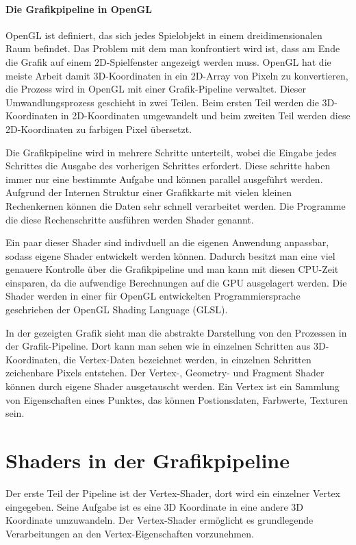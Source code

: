 \subsubsection{Die Grafikpipeline in OpenGL}

OpenGL ist definiert, das sich jedes Spielobjekt in einem dreidimensionalen Raum befindet. Das Problem mit dem man konfrontiert wird ist, dass am Ende die Grafik auf einem 2D-Spielfenster angezeigt werden muss. OpenGL hat die meiste Arbeit damit 3D-Koordinaten in ein 2D-Array von Pixeln zu konvertieren, die Prozess wird in OpenGL mit einer Grafik-Pipeline verwaltet. Dieser Umwandlungsprozess geschieht in zwei Teilen. Beim ersten Teil werden die 3D-Koordinaten in 2D-Koordinaten umgewandelt und beim zweiten Teil werden diese 2D-Koordinaten zu farbigen Pixel übersetzt.

Die Grafikpipeline wird in mehrere Schritte unterteilt, wobei die Eingabe jedes Schrittes die Ausgabe des vorherigen Schrittes erfordert. Diese schritte haben immer nur eine bestimmte Aufgabe und können parallel ausgeführt werden. Aufgrund der Internen Struktur einer Grafikkarte mit vielen kleinen Rechenkernen können die Daten sehr schnell verarbeitet werden. Die Programme die diese Rechenschritte ausführen werden Shader genannt.

Ein paar dieser Shader sind indivduell an die eigenen Anwendung anpassbar, sodass eigene Shader entwickelt werden können. Dadurch besitzt man eine viel genauere Kontrolle über die Grafikpipeline und man kann mit diesen CPU-Zeit einsparen, da die aufwendige Berechnungen auf die GPU ausgelagert werden. Die Shader werden in einer für OpenGL entwickelten Programmiersprache geschrieben der OpenGL Shading Language (GLSL).


In der gezeigten Grafik sieht man die abstrakte Darstellung von den Prozessen in der Grafik-Pipeline. Dort kann man sehen wie in einzelnen Schritten aus 3D-Koordinaten, die Vertex-Daten bezeichnet werden, in einzelnen Schritten zeichenbare Pixels entstehen. Der Vertex-, Geometry- und Fragment Shader können durch eigene Shader ausgetauscht werden. Ein Vertex ist ein Sammlung von Eigenschaften eines Punktes, das können Postionsdaten, Farbwerte, Texturen sein.

\chapter*{Shaders in der Grafikpipeline}

Der erste Teil der Pipeline ist der Vertex-Shader, dort wird ein einzelner Vertex eingegeben. Seine Aufgabe ist es eine 3D Koordinate in eine andere 3D Koordinate umzuwandeln. Der Vertex-Shader ermöglicht es grundlegende Verarbeitungen an den Vertex-Eigenschaften vorzunehmen. %

